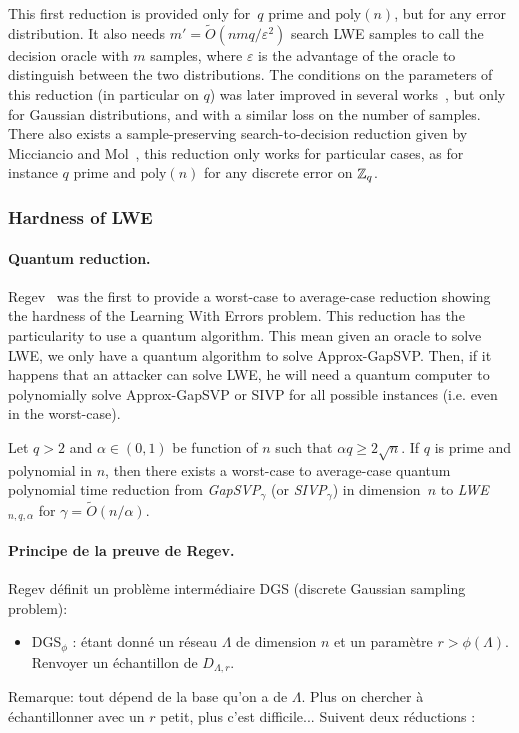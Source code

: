 This first reduction is provided only for~$q$ prime and $\text{poly}(n)$, but for any error distribution. It also needs $m' = \tilde{O}(nmq/\varepsilon^2)$ search LWE samples to call the decision oracle with $m$ samples, where $\varepsilon$ is the advantage of the oracle to distinguish between the two distributions. 
The conditions on the parameters of this reduction (in particular on $q$) was later improved in several works~\cite{Pei09,MP12,BLPRS13}, but only for Gaussian distributions, and with a similar loss on the number of samples.
There also exists a sample-preserving search-to-decision reduction given by Micciancio and Mol~\cite{MM11}, this reduction only works for particular cases, as for instance $q$ prime and $\text{poly}(n)$ for any discrete error on $\mathbb{Z}_q$.


\subsubsection{Hardness of LWE}



\paragraph{Quantum reduction.} Regev~\cite{Reg05,Reg09} was the first to provide a worst-case to average-case reduction showing the hardness of the Learning With Errors problem. This reduction has the particularity to use a quantum algorithm. This mean given an oracle to solve LWE, we only have a quantum algorithm to solve Approx-GapSVP. Then, if it happens that an attacker can solve LWE, he will need a quantum computer to polynomially solve Approx-GapSVP or SIVP for all possible instances (i.e. even in the worst-case). 

\begin{theorem}
Let $q >2$ and $\alpha \in (0,1)$ be function of $n$ such that $\alpha q \geq 2 \sqrt{n}$. If $q$ is prime and polynomial in $n$, then there exists a worst-case to average-case quantum polynomial time reduction from \emph{GapSVP}$_{\gamma}$ (or \emph{SIVP}$_{\gamma}$) in dimension~$n$ to \emph{LWE}$_{n,q,\alpha}$ for $\gamma = \tilde{O}(n/\alpha)$. 
\end{theorem}


\paragraph{Principe de la preuve de Regev.}
Regev définit un problème intermédiaire DGS (discrete Gaussian sampling problem):
\begin{itemize}
\item DGS$_{\phi}$ : étant donné un réseau $\Lambda$ de dimension $n$ et un paramètre $r > \phi(\Lambda)$. Renvoyer un échantillon de $D_{\Lambda,r}$.
\end{itemize}
Remarque: tout dépend de la base qu'on a de $\Lambda$.
Plus on chercher à échantillonner avec un $r$ petit, plus c'est difficile... Suivent deux réductions :

